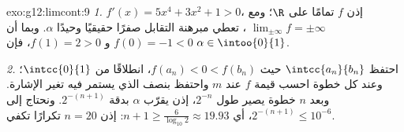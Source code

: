 \begin{solution}{exo:g12:limcont:9}
\emph{1.} $f'(x) = 5x^4 + 3x^2 + 1 > 0$، إذن $f$  تمامًا على
$\R$؛ ومع $\lim_{\pm\infty} f = \pm\infty$ ، تعطي مبرهنة
التقابل صفرًا حقيقيًا وحيدًا $\alpha$. وبما أن $f(0) = -1 < 0$ و
$f(1) = 2 > 0$، فإن $\alpha \in \intoo{0}{1}$.

\emph{2.} احتفظ  $\intcc{a_n}{b_n}$ حيث
$f(a_n) < 0 < f(b_n)$، انطلاقًا من $\intcc{0}{1}$؛ وعند كل خطوة احسب
قيمة $f$ عند  $m$ واحتفظ بنصف  الذي يستمر فيه تغير
الإشارة. وبعد $n$ خطوة يصير طول  $2^{-n}$، إذن يقرّب 
$\alpha$ بدقة $2^{-(n+1)}$. ونحتاج إلى
$2^{-(n+1)} \leq 10^{-6}$، أي $n + 1 \geq \frac{6}{\log_{10} 2} \approx 19.93$:
إذن $n = 20$ تكرارًا تكفي.
\end{solution}


